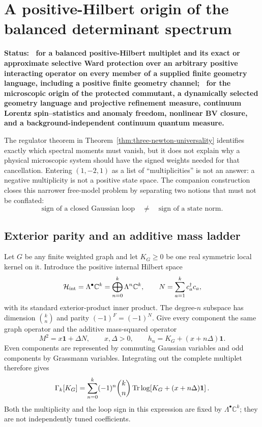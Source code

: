 \section{A positive-Hilbert origin of the balanced determinant spectrum}
\label{sec:positive-hilbert-balance}

\textbf{Status: \StatusModel\ for a balanced positive-Hilbert multiplet and
its exact or approximate selective Ward protection over an arbitrary
positive interacting operator on every member of a supplied finite geometry
language, including a positive finite geometry channel; \StatusOpen\ for the
microscopic origin of the protected commutant, a dynamically selected
geometry language and projective refinement measure, continuum Lorentz
spin--statistics and anomaly freedom, nonlinear BV closure, and a
background-independent continuum quantum measure.}

The regulator theorem in
Theorem~\ref{thm:three-newton-universality} identifies exactly which
spectral moments must vanish, but it does not explain why a physical
microscopic system should have the signed weights needed for that
cancellation.  Entering \((1,-2,1)\) as a list of ``multiplicities'' is not
an answer: a negative multiplicity is not a positive state space.  The
companion construction \cite{XuPositiveHilbertBalance2026} closes this
narrower free-model problem by separating two notions that must not be
conflated:
\[
 \text{sign of a closed Gaussian loop}
 \quad\ne\quad
 \text{sign of a state norm}.
\]

\subsection{Exterior parity and an additive mass ladder}

Let \(G\) be any finite weighted graph and let \(K_G\geq0\) be one real
symmetric local kernel on it.  Introduce the positive internal Hilbert space
\begin{equation}
 \mathcal H_{\rm int}=\Lambda^\bullet\mathbb C^k
 =\bigoplus_{n=0}^{k}\Lambda^n\mathbb C^k,
 \qquad
 N=\sum_{a=1}^{k}c_a^\dagger c_a ,
 \label{eq:ph-exterior}
\end{equation}
with its standard exterior-product inner product.  The degree-\(n\)
subspace has dimension \(\binom{k}{n}\) and parity
\((-1)^F=(-1)^N\).  Give every component the same graph operator and the
additive mass-squared operator
\begin{equation}
 M^2=x\mathbf 1+\Delta N,\qquad x,\Delta>0,\qquad
 h_n=K_G+(x+n\Delta)\mathbf 1 .
 \label{eq:ph-mass}
\end{equation}
Even components are represented by commuting Gaussian variables and odd
components by Grassmann variables.  Integrating out the complete multiplet
therefore gives
\begin{equation}
 \Gamma_k[K_G]
 =\sum_{n=0}^{k}(-1)^n\binom{k}{n}
   \operatorname{Tr}\log\!\left[K_G+(x+n\Delta)\mathbf 1\right].
 \label{eq:ph-gamma}
\end{equation}
Both the multiplicity and the loop sign in this expression are fixed by
\(\Lambda^\bullet\mathbb C^k\); they are not independently tuned
coefficients.

